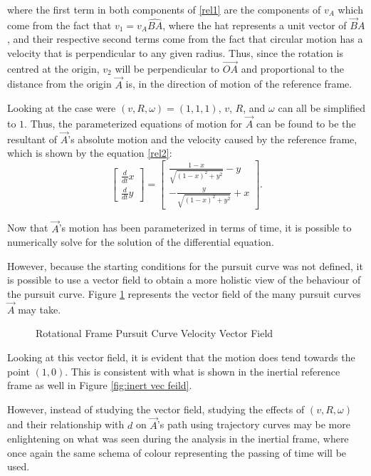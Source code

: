\documentclass[pstricks, border=12pt]{article}
\begin{document}
 where the first term in both components of \ref{rel1} are the components of $v_A$ which come from the fact that $v_1 = v_A\hat{BA}$, where the hat represents a unit vector of $\vec BA$, and their respective second terms come from the fact that circular motion has a velocity that is perpendicular to any given radius. Thus, since the rotation is centred at the origin, $v_2$ will be perpendicular to $\Vec{OA}$ and proportional to the distance from the origin $\vec A$ is, in the direction of motion of the reference frame. 

Looking at the case were $(v, R, \omega) = (1, 1, 1)$, $v$, $R$, and $\omega$ can all be simplified to $1$. Thus, the parameterized equations of motion for $\Vec{A}$ can be found to be the resultant of $\Vec{A}$'s absolute motion and the velocity caused by the reference frame, which is shown by the equation \eqref{rel2}:
  \begin{equation}
     \begin{bmatrix}
         \frac{d}{dt}x\\
         \frac{d}{dt}y
     \end{bmatrix}
     =
     \begin{bmatrix}
         \frac{1-x}{\sqrt{(1-x)^2+y^2}} - y\\
         -\frac{y}{\sqrt{(1-x)^2+y^2}} + x
     \end{bmatrix}.
     \label{rel2}
 \end{equation}

 Now that $\Vec{A}$'s motion has been parameterized in terms of time, it is possible to numerically solve for the solution of the differential equation. 

 However, because the starting conditions for the pursuit curve was not defined, it is possible to use a vector field to obtain a more holistic view of the behaviour of the pursuit curve. Figure \ref{fig:relvecfield} represents the vector field of the many pursuit curves $\vec A$ may take.
\begin{figure}[tbh]
    \centering
    
    \caption{Rotational Frame Pursuit Curve Velocity Vector Field}
    \label{fig:relvecfield}
\end{figure}
 
 Looking at this vector field, it is evident that the motion does tend towards the point $(1, 0)$. This is consistent with what is shown in the inertial reference frame as well in Figure \ref{fig:inert vec feild}. 

 However, instead of studying the vector field, studying the effects of $(v, R, \omega)$ and their relationship with $d$ on $\Vec{A}$'s path using trajectory curves may be more enlightening on what was seen during the analysis in the inertial frame, where once again the same schema of colour representing the passing of time will be used.
\end{document}
